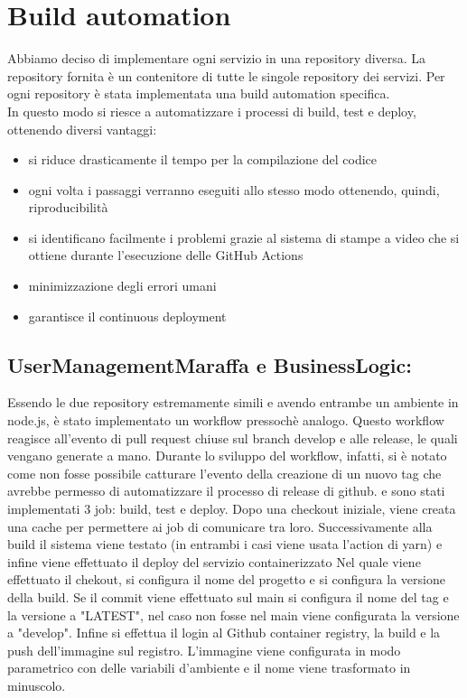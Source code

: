 \section{Build automation}
Abbiamo deciso di implementare ogni servizio in una repository diversa. La repository fornita è un contenitore di tutte le singole repository dei servizi.
Per ogni repository è stata implementata una build automation specifica. \\
In questo modo si riesce a automatizzare i processi di build, test e deploy, ottenendo diversi vantaggi:
\begin{itemize}
    \item si riduce drasticamente il tempo per la compilazione del codice
    \item ogni volta i passaggi verranno eseguiti allo stesso modo ottenendo, quindi, riproducibilità
    \item si identificano facilmente i problemi grazie al sistema di stampe a video che si ottiene durante l'esecuzione delle GitHub Actions
    \item minimizzazione degli errori umani
    \item garantisce il continuous deployment 
\end{itemize}


\subsection{UserManagementMaraffa e BusinessLogic:} Essendo le due repository estremamente simili e avendo entrambe un ambiente in node.js, è stato implementato un workflow pressochè analogo.
 Questo workflow reagisce all'evento di pull request chiuse sul branch develop e alle release, le quali vengano generate a mano. Durante lo sviluppo del workflow, infatti, si 
 è notato come non fosse possibile catturare l'evento della creazione di un nuovo tag che avrebbe permesso di automatizzare 
 il processo di release di github.
e sono stati implementati 3 job: build, test e deploy.
Dopo una checkout iniziale,
 viene creata una cache per permettere ai job di comunicare tra loro. Successivamente alla build il sistema viene testato
  (in entrambi i casi viene usata l'action di yarn) e infine viene effettuato il deploy del servizio containerizzato
 Nel quale viene effettuato il chekout, si configura il nome del progetto e si configura la versione della build.
 Se il commit viene effettuato sul main si configura il nome del tag e la versione a "LATEST", nel caso non fosse nel main viene configurata la versione a "develop".
  Infine si effettua il login al Github container registry, la build e la push dell'immagine sul registro. L'immagine viene configurata in modo parametrico con delle variabili d'ambiente e il nome viene trasformato in minuscolo. 

